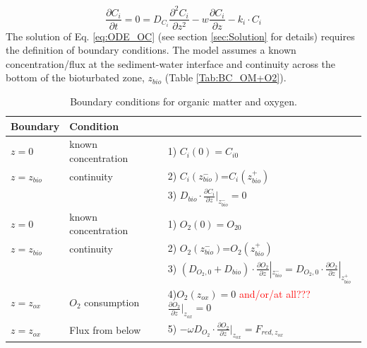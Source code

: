 \documentclass[gmd, manuscript]{copernicus}
\begin{document}
\begin{equation}
 \frac{\partial C_i}{\partial t} = 0= D_{C_i} \frac{\partial^2C_i }{\partial z^2} - w\frac{\partial C_i }{\partial z} - k_i\cdot C_{i} \label{eq:ODE_OC}
\end{equation}
The solution of Eq. \ref{eq:ODE_OC} (see section \ref{sec:Solution} for details) requires the definition of boundary conditions. The model assumes a known concentration/flux at the sediment-water interface and continuity 
across the bottom of the bioturbated zone, $z_{bio}$ (Table \ref{Tab:BC_OM+O2}).
\begin{table}[tbp]
\caption{Boundary conditions for organic matter and oxygen.}
\centering
\begin{tabular}{ |l| l| l|}
\hline
\textbf{Boundary}& \textbf{Condition}&\\
\hline
$z=0$& known concentration& 1) $C_i(0)=C_{i0}$\\
$z=z_{bio}$&continuity& 2) $C_i(z_{bio}^-)$=$C_i(z_{bio}^+)$\\
               &&3) $D_{bio}\cdot \frac{\partial C_i}{\partial z}|_{z_{bio}^-}=0$\\
\hline
$z=0$& known concentration& 1) $O_2(0)=O_{20}$\\
$z=z_{bio}$&continuity& 2) $O_2(z_{bio}^-)$=$O_2(z_{bio}^+)$\\
               &&3) $\left(D_{O_2,0}+D_{bio}\right )\cdot \frac{\partial O_2}{\partial z}|_{z_{bio}^-}=D_{O_2,0} \cdot \frac{\partial O_2}{\partial z}|_{z_{bio}^+}$\\
$z=z_{ox}$& $O_2$ consumption& 4)$ O_2(z_{ox})=0$  \quad \textcolor{red}{and/or/at all???} \quad $\frac{\partial O_2}{\partial z}|_{z_{ox}}=0$\\
$z=z_{ox}$& Flux from below& 5) $-\omega D_{O_2} \cdot \frac{\partial O_2}{\partial z}|_{z_{ox}}=F_{red, z_{ox}}$\\   

\end{tabular}
\end{table}
\end{document}
